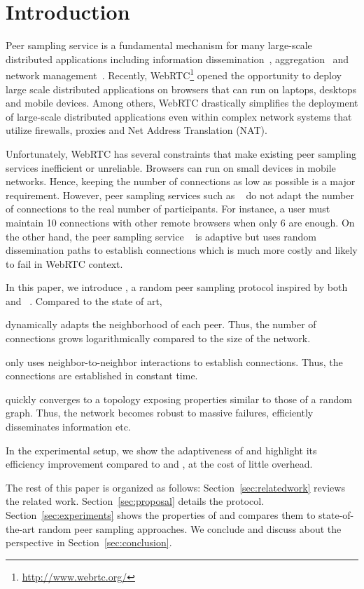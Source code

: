 
\section{Introduction}

Peer sampling service is a fundamental mechanism for many large-scale
distributed applications including information
dissemination~\cite{eugster2003lightweight, tolgyeski2009adaptive},
aggregation~\cite{jelasity2004epidemic} and network
management~\cite{jelasity2009tman, voulgaris2005epidemic}. Recently,
WebRTC\footnote{\url{http://www.webrtc.org/}} opened the opportunity to deploy
large scale distributed applications on browsers that can run on laptops,
desktops and mobile devices. Among others, WebRTC drastically simplifies the
deployment of large-scale distributed applications even within complex network
systems that utilize firewalls, proxies and Net Address Translation (NAT).

Unfortunately, WebRTC has several constraints that make existing peer sampling
services inefficient or unreliable. Brow\-sers can run on small devices in
mobile networks. Hence, keeping the number of connections as low as possible is
a major requirement. However, peer sampling services such as
\CYCLON~\cite{voulgaris2005cyclon} do not adapt the number of connections to
the real number of participants. For instance, a user must maintain 10
connections with other remote browsers when only 6 are enough. On the other
hand, the peer sampling service \SCAMP~\cite{ganesh2003peer} is adaptive but
uses random dissemination paths to establish connections which is much more
costly and likely to fail in WebRTC context.

In this paper, we introduce \SPRAY, a random peer sampling protocol inspired by
both \SCAMP~\cite{ganesh2003peer}
and \CYCLON~\cite{voulgaris2005cyclon}. Compared to the state of art,
\begin{inparaenum}[(i)]
\item \SPRAY dynamically adapts the neighborhood of each peer. Thus, the number
  of connections grows logarithmically compared to the size of the network.
\item \SPRAY only uses neighbor-to-neighbor interactions to establish
  connections. Thus, the connections are established in constant time.
\item \SPRAY quickly converges to a topology exposing properties similar to
  those of a random graph. Thus, the network becomes robust to massive failures,
  efficiently disseminates information etc.
\item In the experimental setup, we show the adaptiveness of \SPRAY and
  highlight its efficiency improvement compared to \CYCLON and \SCAMP, at the
  cost of little overhead.
\end{inparaenum}

The rest of this paper is organized as follows: Section~\ref{sec:relatedwork}
reviews the related work. Section~\ref{sec:proposal} details the \SPRAY
protocol. Section~\ref{sec:experiments} shows the properties of \SPRAY
and compares them to state-of-the-art random peer sampling approaches. We
conclude and discuss about the perspective in Section~\ref{sec:conclusion}.

